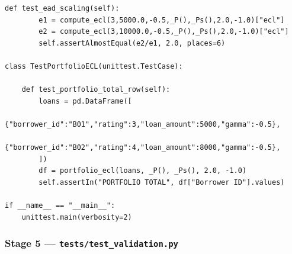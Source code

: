 \documentclass[12pt,a4paper]{article}
\begin{document}
\begin{lstlisting}[caption={test\_forecasting.py --- Stage 4: ECL Forecasting}]
    def test_ead_scaling(self):
        e1 = compute_ecl(3,5000.0,-0.5,_P(),_Ps(),2.0,-1.0)["ecl"]
        e2 = compute_ecl(3,10000.0,-0.5,_P(),_Ps(),2.0,-1.0)["ecl"]
        self.assertAlmostEqual(e2/e1, 2.0, places=6)

class TestPortfolioECL(unittest.TestCase):

    def test_portfolio_total_row(self):
        loans = pd.DataFrame([
            {"borrower_id":"B01","rating":3,"loan_amount":5000,"gamma":-0.5},
            {"borrower_id":"B02","rating":4,"loan_amount":8000,"gamma":-0.5},
        ])
        df = portfolio_ecl(loans, _P(), _Ps(), 2.0, -1.0)
        self.assertIn("PORTFOLIO TOTAL", df["Borrower ID"].values)

if __name__ == "__main__":
    unittest.main(verbosity=2)
\end{lstlisting}

\subsubsection{Stage 5 --- \texttt{tests/test\_validation.py}}
\end{document}
